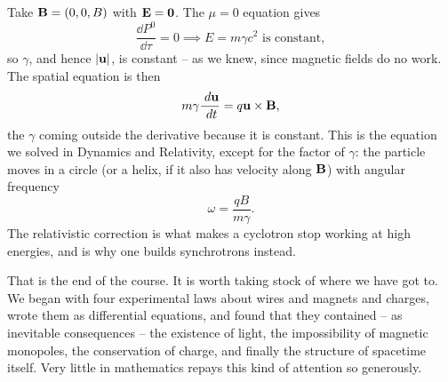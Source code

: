 \documentclass[a4paper]{scrartcl}
\begin{document}
\begin{example}
	Take $\mathbf{B} = (0,0,B)$ with $\mathbf{E} = \mathbf{0}$. The $\mu = 0$ equation gives
	$$
	\frac{\dd P^0}{\dd\tau} = 0 \implies E = m\gamma c^2 \text{ is constant},
	$$
	so $\gamma$, and hence $|\mathbf{u}|$, is constant -- as we knew, since magnetic fields do no work. The spatial equation is then
	$$
	m\gamma \frac{\; d \mathbf{u}}{\; d t} = q\mathbf{u}\times\mathbf{B},
	$$
	the $\gamma$ coming outside the derivative because it is constant. This is the equation we solved in Dynamics and Relativity, except for the factor of $\gamma$: the particle moves in a circle (or a helix, if it also has velocity along $\mathbf{B}$) with angular frequency
	$$
	\omega = \frac{qB}{m\gamma}.
	$$
	The relativistic correction is what makes a cyclotron stop working at high energies, and is why one builds synchrotrons instead.
\end{example}

That is the end of the course. It is worth taking stock of where we have got to. We began with four experimental laws about wires and magnets and charges, wrote them as differential equations, and found that they contained -- as inevitable consequences -- the existence of light, the impossibility of magnetic monopoles, the conservation of charge, and finally the structure of spacetime itself. Very little in mathematics repays this kind of attention so generously.
\end{document}
